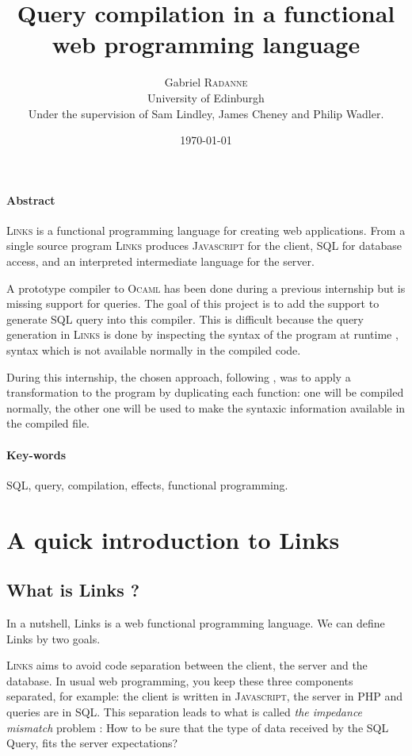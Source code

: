 \documentclass[11pt]{article}
\title{Query compilation in a functional web programming language}
\author{Gabriel \textsc{Radanne}\\ University of Edinburgh\\ Under the supervision of Sam Lindley, James Cheney and Philip Wadler.}
\date{\today}
\newcommand\mysc[1]{{\rmfamily\textsc{#1}}\xspace}
\newcommand\links{\mysc{Links}}
\newcommand\sql{\mysc{SQL}}
\newcommand\js{\mysc{Javascript}}
\newcommand\ocaml{\mysc{Ocaml}}
\begin{document}
\begin{titlepage}
  \maketitle
  \thispagestyle{empty} %

\paragraph{Abstract}
  \links \cite{links:tiers} is a functional programming 
language for creating web applications. From a single source program 
\links produces \js for the client, \sql for database access, and 
an interpreted intermediate language for the server.

A prototype compiler to \ocaml has been done during a previous internship \cite{links:querycomp} but is missing support for queries. The goal of this project is to add the support to generate \sql query into this compiler. This is difficult because the query generation in \links is done by inspecting the syntax of the program at runtime \cite{links:querynorm}, syntax which is not available normally in the compiled code.

During this internship, the chosen approach, following \cite{links:querycomp},  was to apply a transformation to the program by duplicating each function: one will be compiled normally, the other one will be used to make the syntaxic information available in the compiled file.

\paragraph{Key-words} \sql, query, compilation, effects, functional programming.

\end{titlepage}



\section{A quick introduction to Links}

\subsection{What is Links ?}
In a nutshell, Links is a web functional programming language. We can define Links by two goals.

\links aims to avoid code separation between the client, the server and the database. In usual web programming, you keep these three components separated, for example: the client is written in \js, the server in \mysc{PHP} and queries are in \sql. 
This separation leads to what is called {\it the impedance mismatch} problem : How to be sure that the type of data received by the \sql Query, fits the server expectations?
\end{document}
